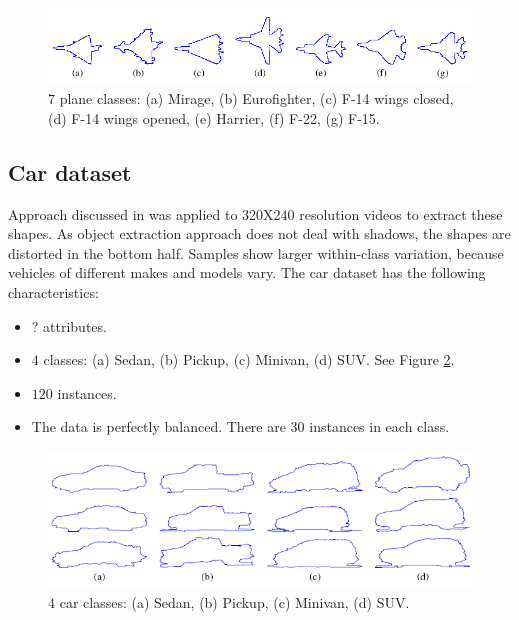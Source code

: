 \documentclass{article} %
\begin{document}
\begin{figure}[ht]
    \centering
    \includegraphics[width=\linewidth]{shape_plane.png}
    \caption{$7$ plane classes: (a) Mirage, (b) Eurofighter, (c) F-14 wings closed, (d) F-14 wings opened, (e) Harrier, (f) F-22, (g) F-15.}
    \label{fig:plane}
\end{figure}

\subsection{Car dataset}

Approach discussed in \cite{Thakoor:2005-Sept} was applied to 320X240 resolution videos to extract these shapes. As object extraction approach does not deal with shadows, the shapes are distorted in the bottom half. Samples show larger within-class variation, because vehicles of different makes and models vary.
The car dataset has the following characteristics:

\begin{itemize}
    \item ? attributes.
    \item $4$ classes: (a) Sedan, (b) Pickup, (c) Minivan, (d) SUV. See Figure \ref{fig:car}.
    \item $120$ instances. 
    \item The data is perfectly balanced. There are 30 instances in each class.
\end{itemize}

\begin{figure}[ht]
    \centering
    \includegraphics[width=\linewidth]{shape_car.png}
    \caption{$4$ car classes: (a) Sedan, (b) Pickup, (c) Minivan, (d) SUV.}
    \label{fig:car}
\end{figure}
\end{document}

